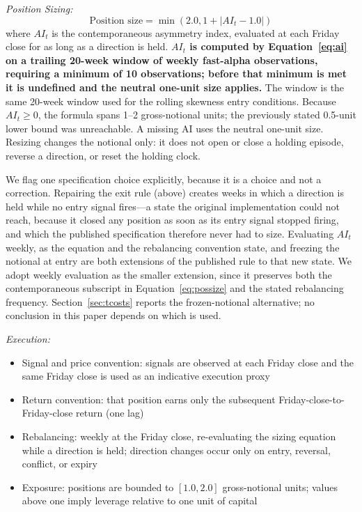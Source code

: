 \documentclass[11pt]{article}
\begin{document}
\textit{Position Sizing:}
\begin{equation}
    \text{Position size} = \min(2.0, 1 + |AI_t - 1.0|)
    \label{eq:possize}
\end{equation}
where $AI_t$ is the contemporaneous asymmetry index, evaluated at each Friday close for as long as a direction is held. \textbf{$AI_t$ is computed by Equation~\ref{eq:ai} on a trailing 20-week window of weekly fast-alpha observations, requiring a minimum of 10 observations; before that minimum is met it is undefined and the neutral one-unit size applies.} The window is the same 20-week window used for the rolling skewness entry conditions. Because $AI_t \geq 0$, the formula spans 1--2 gross-notional units; the previously stated 0.5-unit lower bound was unreachable. A missing AI uses the neutral one-unit size. Resizing changes the notional only: it does not open or close a holding episode, reverse a direction, or reset the holding clock.

We flag one specification choice explicitly, because it is a choice and not a correction. Repairing the exit rule (above) creates weeks in which a direction is held while no entry signal fires---a state the original implementation could not reach, because it closed any position as soon as its entry signal stopped firing, and which the published specification therefore never had to size. Evaluating $AI_t$ weekly, as the equation and the rebalancing convention state, and freezing the notional at entry are both extensions of the published rule to that new state. We adopt weekly evaluation as the smaller extension, since it preserves both the contemporaneous subscript in Equation~\ref{eq:possize} and the stated rebalancing frequency. Section~\ref{sec:tcosts} reports the frozen-notional alternative; no conclusion in this paper depends on which is used.

\textit{Execution:}
\begin{itemize}
    \item Signal and price convention: signals are observed at each Friday close and the same Friday close is used as an indicative execution proxy
    \item Return convention: that position earns only the subsequent Friday-close-to-Friday-close return (one lag)
    \item Rebalancing: weekly at the Friday close, re-evaluating the sizing equation while a direction is held; direction changes occur only on entry, reversal, conflict, or expiry
    \item Exposure: positions are bounded to $[1.0, 2.0]$ gross-notional units; values above one imply leverage relative to one unit of capital
\end{itemize}
\end{document}
